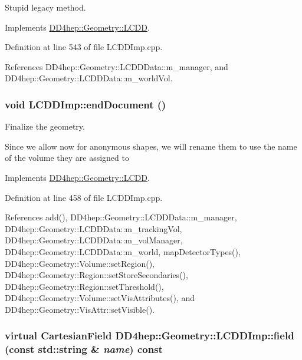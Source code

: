 Stupid legacy method. 

Implements \hyperlink{class_d_d4hep_1_1_geometry_1_1_l_c_d_d_aa67b3fbf93d48e08c08b60cdd83b729f}{DD4hep::Geometry::LCDD}.

Definition at line 543 of file LCDDImp.cpp.

References DD4hep::Geometry::LCDDData::m\_\-manager, and DD4hep::Geometry::LCDDData::m\_\-worldVol.\hypertarget{class_d_d4hep_1_1_geometry_1_1_l_c_d_d_imp_aa3fa37aa7608b67f95aa644dc381389f}{
\subsubsection[{endDocument}]{\setlength{\rightskip}{0pt plus 5cm}void LCDDImp::endDocument ()}}
\label{class_d_d4hep_1_1_geometry_1_1_l_c_d_d_imp_aa3fa37aa7608b67f95aa644dc381389f}


Finalize the geometry. 

Since we allow now for anonymous shapes, we will rename them to use the name of the volume they are assigned to 

Implements \hyperlink{class_d_d4hep_1_1_geometry_1_1_l_c_d_d_abe2147b8363040ce95bb40f810d95b36}{DD4hep::Geometry::LCDD}.

Definition at line 458 of file LCDDImp.cpp.

References add(), DD4hep::Geometry::LCDDData::m\_\-manager, DD4hep::Geometry::LCDDData::m\_\-trackingVol, DD4hep::Geometry::LCDDData::m\_\-volManager, DD4hep::Geometry::LCDDData::m\_\-world, mapDetectorTypes(), DD4hep::Geometry::Volume::setRegion(), DD4hep::Geometry::Region::setStoreSecondaries(), DD4hep::Geometry::Region::setThreshold(), DD4hep::Geometry::Volume::setVisAttributes(), and DD4hep::Geometry::VisAttr::setVisible().\hypertarget{class_d_d4hep_1_1_geometry_1_1_l_c_d_d_imp_a32dc56ebdd198ff9d03d5fcbcb358bc8}{
\subsubsection[{field}]{\setlength{\rightskip}{0pt plus 5cm}virtual {\bf CartesianField} DD4hep::Geometry::LCDDImp::field (const std::string \& {\em name}) const}}
\label{class_d_d4hep_1_1_geometry_1_1_l_c_d_d_imp_a32dc56ebdd198ff9d03d5fcbcb358bc8}


